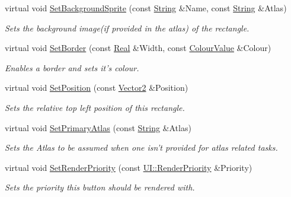 \begin{DoxyCompactItemize}
virtual void \hyperlink{classMezzanine_1_1UI_1_1Rectangle_a9607ad557ba41738a2b6dc31abba6b5c}{SetBackgroundSprite} (const \hyperlink{namespaceMezzanine_acf9fcc130e6ebf08e3d8491aebcf1c86}{String} \&Name, const \hyperlink{namespaceMezzanine_acf9fcc130e6ebf08e3d8491aebcf1c86}{String} \&Atlas)
\begin{DoxyCompactList}\small\item\em Sets the background image(if provided in the atlas) of the rectangle. \item\end{DoxyCompactList}\item 
virtual void \hyperlink{classMezzanine_1_1UI_1_1Rectangle_a7a5309d467b85191c6f9ff82ab09a136}{SetBorder} (const \hyperlink{namespaceMezzanine_a726731b1a7df72bf3583e4a97282c6f6}{Real} \&Width, const \hyperlink{classMezzanine_1_1ColourValue}{ColourValue} \&Colour)
\begin{DoxyCompactList}\small\item\em Enables a border and sets it's colour. \item\end{DoxyCompactList}\item 
virtual void \hyperlink{classMezzanine_1_1UI_1_1Rectangle_a95511f0a8505f07892434bdc363a7674}{SetPosition} (const \hyperlink{classMezzanine_1_1Vector2}{Vector2} \&Position)
\begin{DoxyCompactList}\small\item\em Sets the relative top left position of this rectangle. \item\end{DoxyCompactList}\item 
virtual void \hyperlink{classMezzanine_1_1UI_1_1Rectangle_a7be99336eb1a608b1cf96d6f7e63477e}{SetPrimaryAtlas} (const \hyperlink{namespaceMezzanine_acf9fcc130e6ebf08e3d8491aebcf1c86}{String} \&Atlas)
\begin{DoxyCompactList}\small\item\em Sets the Atlas to be assumed when one isn't provided for atlas related tasks. \item\end{DoxyCompactList}\item 
virtual void \hyperlink{classMezzanine_1_1UI_1_1Rectangle_a30985ea691f36eaafe5d6864eec8ae19}{SetRenderPriority} (const \hyperlink{namespaceMezzanine_1_1UI_ac4c753eb6b5d66350a243acc9ce54130}{UI::RenderPriority} \&Priority)
\begin{DoxyCompactList}\small\item\em Sets the priority this button should be rendered with. \item\end{DoxyCompactList}\item 

\end{DoxyCompactItemize}

